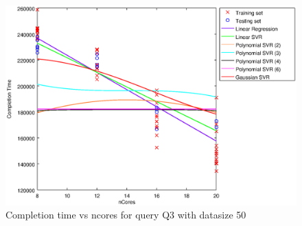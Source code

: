
\begin {figure}[hbtp]
\centering
\includegraphics[width=\textwidth]{output/Q3_50_ALL_FEATURES/plot_Q3_50.eps}
\caption{Completion time vs ncores for query Q3 with datasize 50}
\label{fig:all_linear_Q3_50}
\end {figure}
